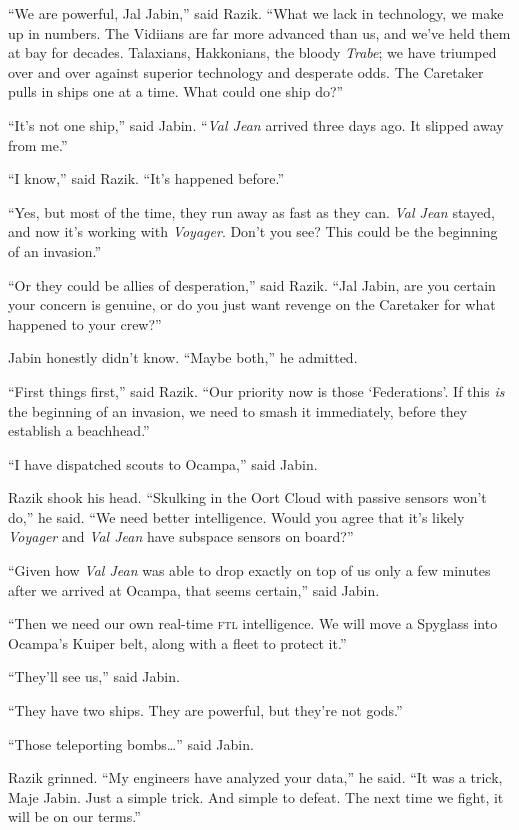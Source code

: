 \documentclass[twoside,letterpaper,12pt]{memoir}
\begin{document}
``We are powerful, Jal Jabin,'' said Razik. ``What we lack in technology, we make up in numbers. The Vidiians are far more advanced than us, and we've held them at bay for decades. Talaxians, Hakkonians, the bloody \textit{Trabe}; we have triumped over and over against superior technology and desperate odds. The Caretaker pulls in ships one at a time. What could one ship do?''

``It's not one ship,'' said Jabin. ``\textit{Val Jean} arrived three days ago. It slipped away from me.''

``I know,'' said Razik. ``It's happened before.''

``Yes, but most of the time, they run away as fast as they can. \textit{Val Jean} stayed, and now it's working with \textit{Voyager}. Don't you see? This could be the beginning of an invasion.''

``Or they could be allies of desperation,'' said Razik. ``Jal Jabin, are you certain your concern is genuine, or do you just want revenge on the Caretaker for what happened to your crew?''

Jabin honestly didn't know. ``Maybe both,'' he admitted.

``First things first,'' said Razik. ``Our priority now is those `Federations'. If this \textit{is} the beginning of an invasion, we need to smash it immediately, before they establish a beachhead.''

``I have dispatched scouts to Ocampa,'' said Jabin.

Razik shook his head. ``Skulking in the Oort Cloud with passive sensors won't do,'' he said. ``We need better intelligence. Would you agree that it's likely \textit{Voyager} and \textit{Val Jean} have subspace sensors on board?''

``Given how \textit{Val Jean} was able to drop exactly on top of us only a few minutes after we arrived at Ocampa, that seems certain,'' said Jabin.

``Then we need our own real-time \textsc{ftl} intelligence. We will move a Spyglass into Ocampa's Kuiper belt, along with a fleet to protect it.''

``They'll see us,'' said Jabin.

``They have two ships. They are powerful, but they're not gods.''

``Those teleporting bombs\ldots '' said Jabin.

Razik grinned. ``My engineers have analyzed your data,'' he said. ``It was a trick, Maje Jabin. Just a simple trick. And simple to defeat. The next time we fight, it will be on our terms.''
\end{document}
